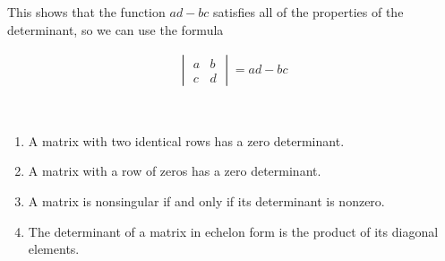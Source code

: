 \begin{example}
\begin{enumerate}
\end{enumerate}

This shows that the function $ad-bc$ satisfies all of the properties of the determinant, so we can use the formula

\begin{align*}
\begin{vmatrix} a & b \\ c & d 
\end{vmatrix} = ad-bc
\end{align*}



\end{example}


\begin{lemma} ~

\begin{enumerate}
\item A matrix with two identical rows has a zero determinant.
\item A matrix with a row of zeros has a zero determinant. 
\item A matrix is nonsingular if and only if its determinant is nonzero. 
\item The determinant of a matrix in echelon form is the product of its diagonal elements.  
\end{enumerate}
\end{lemma}

